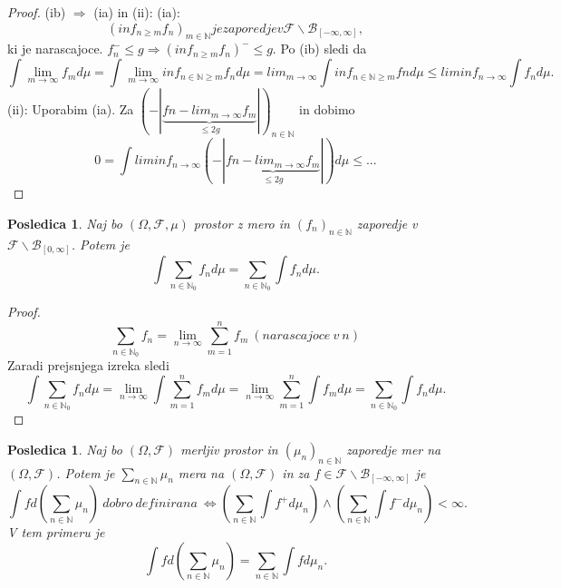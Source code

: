 \documentclass[a4paper,12pt]{article}
\theoremstyle{definition} %
\theoremstyle{plain} %
\newtheorem{posledica}[definicija]{Posledica}
\newcommand{\N}{\mathbb{N}}
\newcommand{\F}{\mathcal{F}}
\begin{document}
            \begin{proof}
                (ib) $\Rightarrow$ (ia) in (ii):
                (ia):
                $$
                    \left(inf_{n \geq m} f_n\right)_{m \in \N} je zaporedje v \F\backslash\mathcal{B}_{[-\infty, \infty]},
                $$
                ki je narascajoce. $f_n^- \leq g \Rightarrow \left(inf_{n \geq m} f_n\right)^- \leq g$. Po (ib) sledi da 
                $$
                    \int \lim_{m \rightarrow \infty}f_m d\mu =  \int \lim_{m \rightarrow \infty} inf_{n \in \N \geq m} f_n d\mu
                    = lim_{m \rightarrow \infty} \int inf_{n \in \N \geq m} fn d\mu \leq liminf_{n \rightarrow \infty} \int f_n d\mu.
                $$
                (ii):
                Uporabim (ia). Za $\left(- |\underbrace{fn - lim_{m\rightarrow \infty} f_m}_{\leq 2g}|\right)_{n \in \N}$ in dobimo 
                $$
                    0 = \int liminf_{n \rightarrow \infty} \left(- |\underbrace{fn - lim_{m\rightarrow \infty} f_m}_{\leq 2g}|\right) d\mu
                    \leq ...
                $$
            \end{proof}

            \begin{posledica}
                Naj bo $(\Omega, \F, \mu)$ prostor z mero in $(f_n)_{n \in \N}$ zaporedje v $\F\backslash\mathcal{B}_{[0, \infty]}$.
                Potem je 
                $$
                    \int \sum_{n \in \N_0}f_n d\mu = \sum_{n \in \N_0}\int f_n d\mu.
                $$
            \end{posledica}

            \begin{proof}
                $$
                    \sum_{n \in \N_0}f_n = \lim_{n \rightarrow \infty}\sum_{m = 1}^n f_m \ (narascajoce \ v \ n)
                $$
                Zaradi prejsnjega izreka sledi
                $$
                    \int \sum_{n \in \N_0}f_n d\mu = \lim_{n \rightarrow \infty}\int \sum_{m = 1}^n f_m d\mu = 
                    \lim_{n \rightarrow \infty}\sum_{m = 1}^n \int f_m d\mu = \sum_{n \in \N_0}\int f_n d\mu.
                $$
            \end{proof}
            
            \begin{posledica}
                Naj bo $(\Omega, \F)$ merljiv prostor in $(\mu_n)_{n \in \N}$ zaporedje mer na $(\Omega, \F)$. Potem je 
                $\sum_{n \in \N}\mu_n$ mera na $(\Omega, \F)$ in za $f \in \F\backslash\mathcal{B}_{[-\infty, \infty]}$ je
                $$
                    \int fd\left(\sum_{n \in \N}\mu_n\right) \ dobro \ definirana \ \iff 
                    \left( \sum_{n \in \N}\int f^+d\mu_n\right) \wedge \left(\sum_{n \in \N}\int f^-d\mu_n\right) < \infty.
                $$
                V tem primeru je 
                $$
                    \int f d(\sum_{n \in \N}\mu_n) = \sum_{n \in \N}\int fd\mu_n.
                $$
            \end{posledica}
\end{document}
